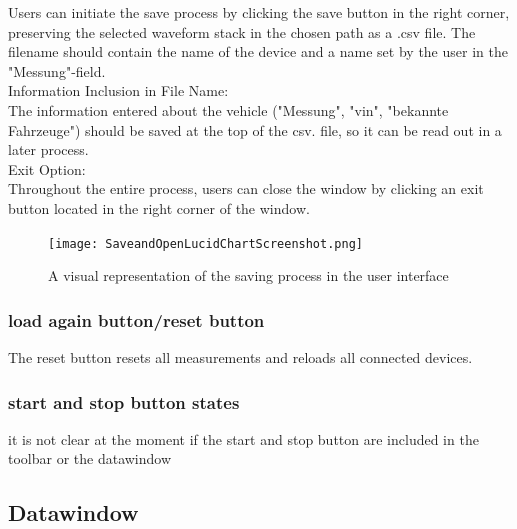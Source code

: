\documentclass{scrreprt}
\begin{document}
Users can initiate the save process by clicking the save button in the right corner, preserving the selected waveform stack in the chosen path as a .csv file. The filename should contain the name of the device and a name set by the user in the "Messung"-field.\\

Information Inclusion in File Name:\\

The information entered about the vehicle ("Messung", "vin", "bekannte Fahrzeuge") should be saved at the top of the csv. file, so it can be read out in a later process.\\

Exit Option:\\

Throughout the entire process, users can close the window by clicking an exit button located in the right corner of the window.\\


\begin{figure}
    \texttt{[image: SaveandOpenLucidChartScreenshot.png]}
    \caption[]{A visual representation of the saving process in the user interface}
    \label{fig:saveData}
\end{figure}

\subsubsection{load again button/reset button}

The reset button resets all measurements and reloads all connected devices.


\subsubsection{start and stop button states}

it is not clear at the moment if the start and stop button are included in the toolbar or the datawindow



\subsection{Datawindow}
\end{document}
